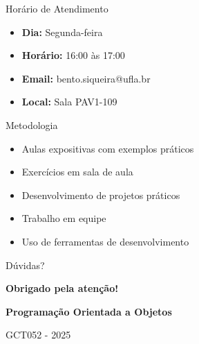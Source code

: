 \documentclass[aspectratio=169]{beamer}
\begin{document}
\begin{frame}{Horário de Atendimento}
\begin{itemize}
    \item \textbf{Dia:} Segunda-feira
    \item \textbf{Horário:} 16:00 às 17:00
    \item \textbf{Email:} bento.siqueira@ufla.br
    \item \textbf{Local:} Sala PAV1-109
\end{itemize}
\end{frame}

\begin{frame}{Metodologia}
\begin{itemize}
    \item Aulas expositivas com exemplos práticos
    \item Exercícios em sala de aula
    \item Desenvolvimento de projetos práticos
    \item Trabalho em equipe
    \item Uso de ferramentas de desenvolvimento
\end{itemize}
\end{frame}

\begin{frame}{Dúvidas?}
\begin{center}
\Large
\textbf{Obrigado pela atenção!}

\vspace{1cm}
\textbf{Programação Orientada a Objetos}

\vspace{0.5cm}
GCT052 - 2025
\end{center}
\end{frame}
\end{document}
